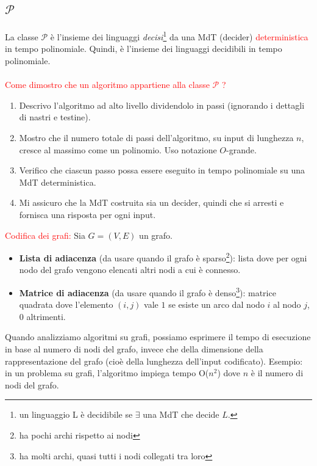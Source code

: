 \documentclass{article}  %
\theoremstyle{definition}
\begin{document}
\subsection{$\mathcal{P}$}
La classe $\mathcal{P}$ è l'insieme dei linguaggi \textit{decisi}\footnote{un linguaggio L è decidibile se $\exists$ una MdT che decide $L$.} da una MdT (decider) \textcolor{red}{deterministica} in tempo polinomiale.
Quindi, è l'insieme dei linguaggi decidibili in tempo polinomiale. \\ \\
\textcolor{red}{Come dimostro che un algoritmo appartiene alla classe $\mathcal{P}$ ?}
\begin{enumerate}
	\item Descrivo l'algoritmo ad alto livello dividendolo in passi (ignorando i dettagli di nastri e testine).
	\item Mostro che il numero totale di passi dell'algoritmo, su input di lunghezza $n$, cresce al massimo come un polinomio. Uso notazione $O$-grande.
	\item Verifico che ciascun passo possa essere eseguito in tempo polinomiale su una MdT deterministica.
	\item Mi assicuro che la MdT costruita sia un decider, quindi che si arresti e fornisca una risposta per ogni input.
\end{enumerate}
\textcolor{red}{Codifica dei grafi:} Sia $G=(V,E)$ un grafo.
\begin{itemize}
	\item \textbf{Lista di adiacenza} (da usare quando il grafo è sparso\footnote{ha pochi archi rispetto ai nodi}): lista dove per ogni nodo del grafo vengono elencati altri nodi a cui è connesso.
	\item \textbf{Matrice di adiacenza} (da usare quando il grafo è denso\footnote{ha molti archi, quasi tutti i nodi collegati tra loro}): matrice quadrata dove l'elemento $(i,j)$ vale $1$
	      se esiste un arco dal nodo $i$ al nodo $j$, $0$ altrimenti.
\end{itemize}
\begin{osservazioni}[Osservazione]
	\footnotesize
	Quando analizziamo algoritmi su grafi, possiamo esprimere il tempo di esecuzione in base al numero di nodi del grafo, invece che della dimensione della rappresentazione del
	grafo (cioè della lunghezza dell’input codificato). Esempio: in un problema su grafi, l'algoritmo impiega tempo O($n^2$) dove $n$ è il numero di nodi del grafo.
\end{osservazioni}
\end{document}

